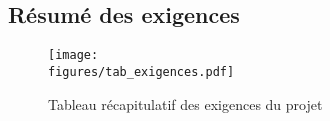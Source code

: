 \subsection{Résumé des exigences}

\begin{figure}[H]
	\centering
    \texttt{[image: \\figures/tab\_exigences.pdf]}
    \decoRule
    \caption[
    Tableau récapitulatif des exigences du projet]{
    Tableau récapitulatif des exigences du projet}
    \label{fig:Tableau récapitulatif des exigences du projet}
	\end{figure}

